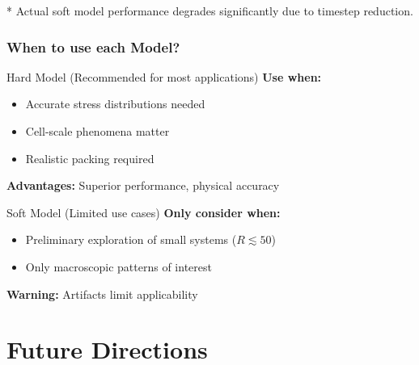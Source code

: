 \documentclass[10pt,t]{beamer}
\begin{document}
\begin{frame}
    \vspace{0.3cm}
    \footnotesize{\textup{*} Actual soft model performance degrades significantly due to timestep reduction.}

\end{frame}

\begin{frame}
    \frametitle{When to use each Model?}

    \vspace{-0.1cm}
    \begin{block}{Hard Model (Recommended for most applications)}
        \textbf{Use when:}
        \begin{itemize}
            \item Accurate stress distributions needed
            \item Cell-scale phenomena matter
            \item Realistic packing required
        \end{itemize}

        \textbf{Advantages:} Superior performance, physical accuracy
    \end{block}

    \begin{block}{Soft Model (Limited use cases)}
        \textbf{Only consider when:}
        \begin{itemize}
            \item Preliminary exploration of small systems ($R \lesssim 50$)
            \item Only macroscopic patterns of interest
        \end{itemize}

        \textbf{Warning:} Artifacts limit applicability
    \end{block}

\end{frame}



\section{Future Directions}
\end{document}
